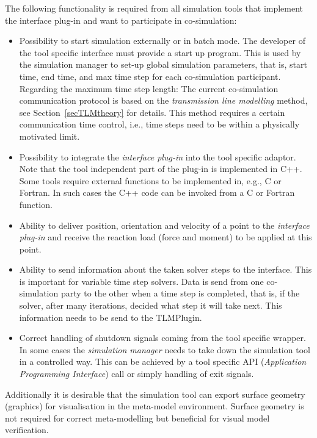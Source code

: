 The following functionality is required from all simulation
tools that implement the interface plug-in and want to participate in
co-simulation:
\begin{itemize}
\item Possibility to start simulation externally or in batch mode.
  The developer of the tool specific interface must provide a start up
  program. This is used by the simulation manager to set-up global
  simulation parameters, that is, start time, end time, and max time
  step for each co-simulation participant. Regarding the maximum time
  step length: The current co-simulation communication protocol is
  based on the {\em transmission line modelling} method, see
  Section~\ref{secTLMtheory} for details. This method requires a
  certain communication time control, i.e., time steps need to be
  within a physically motivated limit.

\item Possibility to integrate the {\em interface plug-in} into the tool specific
	adaptor. Note that the tool independent part of the plug-in is
	implemented in C++. Some tools require external functions to
	be implemented in, e.g., C or Fortran. In such cases the C++
	code can be invoked from a C or Fortran function.

\item Ability to deliver position, orientation and velocity of a
	point to the {\em interface plug-in} and receive the reaction
	load (force and moment) to be applied at this point.

\item Ability to send information about the taken solver steps to the
  interface. This is important for variable time step solvers. Data is
  send from one co-simulation party to the other when a time step is
  completed, that is, if the solver, after many iterations, decided
  what step it will take next. This information needs to be send to
  the TLMPlugin.

\item Correct handling of shutdown signals coming from the tool specific
	wrapper. In some cases the {\em simulation manager} needs to
	take down the simulation tool in a controlled way. This can be
	achieved by a tool specific API ({\em Application Programming
	Interface}) call or simply handling of exit signals.

\end{itemize}

Additionally it is desirable that the simulation tool can export
surface geometry (graphics) for visualisation in the meta-model
environment. Surface geometry is not required for correct
meta-modelling but beneficial for visual model verification.

